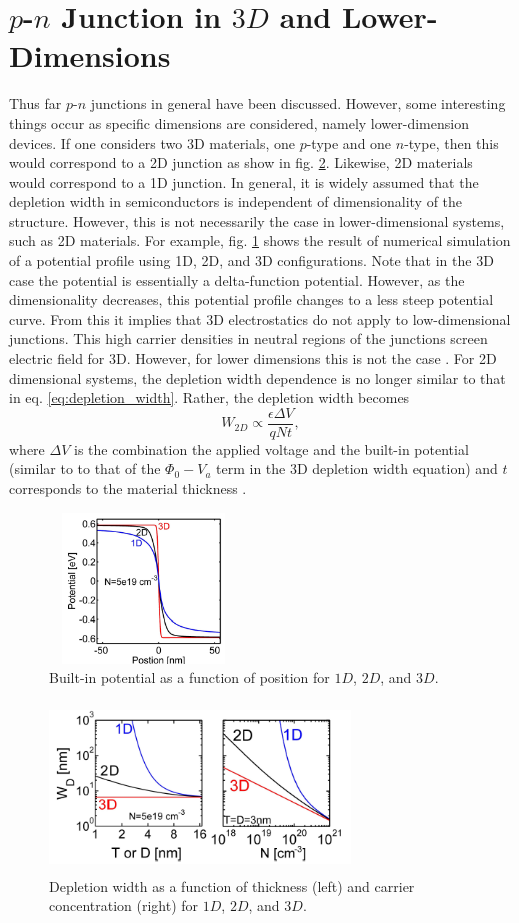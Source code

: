 \section{$p$-$n$ Junction in $3D$ and Lower-Dimensions}\label{sec:sec004}
Thus far $p$-$n$ junctions in general have been discussed. However, some interesting things occur as specific
dimensions are considered, namely lower-dimension devices. If one considers two 3D materials, one $p$-type and one $n$-type, then this would
correspond to a 2D junction as show in fig. \ref{fig:fig08}. Likewise, 2D materials would correspond to a 1D junction. In general, it is widely assumed that the depletion width in 
semiconductors is independent of dimensionality of the structure. However, this is not necessarily the case in lower-dimensional systems, such as 2D materials.
For example, fig. \ref{fig:fig09} shows the result of numerical simulation of a potential profile using 1D, 2D, and 3D configurations. Note that in the 3D case
the potential is essentially a delta-function potential. However, as the dimensionality decreases, this potential profile changes to a less steep potential curve.
From this it implies that 3D electrostatics do not apply to low-dimensional junctions. This high carrier densities in neutral regions of the junctions screen electric field for 3D.
However, for lower dimensions this is not the case \cite{Ilatikhameneh2016}. For 2D dimensional systems, the depletion width dependence is no longer similar to 
that in eq. \ref{eq:depletion_width}. Rather, the depletion width becomes
\begin{equation}\label{eq:wd_2d}
    W_{2D}\propto \frac{\epsilon \Delta V}{qNt},
\end{equation}
where $\Delta V$ is the combination the applied voltage and the built-in potential (similar to to that of the $\Phi_0 - V_a$ term in the 3D depletion width equation) and $t$ corresponds to
the material thickness \cite{Ilatikhameneh2017}.
\begin{figure}[h!]\label{fig:fig09}
    \centering
    \includegraphics[height=4cm,width=5cm]{figs/2d_3d}
    \caption{Built-in potential as a function of position for $1D$, $2D$, and $3D$.}
\end{figure}

\begin{figure}[h!]\label{fig:fig08}
    \centering
    \includegraphics[height=4.5cm,width=8cm]{figs/2d_3d_wd_dep}
    \caption{Depletion width as a function of thickness (left) and carrier concentration (right) for $1D$, $2D$, and $3D$.}
\end{figure} 